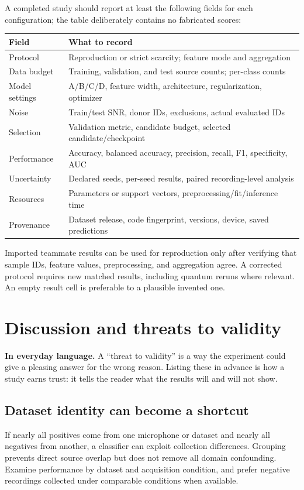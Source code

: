 \documentclass[11pt,letterpaper]{article}
\newcommand{\plain}[1]{\par\smallskip\noindent\textbf{In everyday language.} #1\par\smallskip}
\begin{document}
A completed study should report at least the following fields for each
configuration; the table deliberately contains no fabricated scores:
\begin{center}
\begin{tabularx}{\linewidth}{@{}lY@{}}
\toprule
Field & What to record \\
\midrule
Protocol & Reproduction or strict scarcity; feature mode and aggregation \\
Data budget & Training, validation, and test source counts; per-class counts \\
Model settings & A/B/C/D, feature width, architecture, regularization, optimizer \\
Noise & Train/test SNR, donor IDs, exclusions, actual evaluated IDs \\
Selection & Validation metric, candidate budget, selected candidate/checkpoint \\
Performance & Accuracy, balanced accuracy, precision, recall, F1, specificity, AUC \\
Uncertainty & Declared seeds, per-seed results, paired recording-level analysis \\
Resources & Parameters or support vectors, preprocessing/fit/inference time \\
Provenance & Dataset release, code fingerprint, versions, device, saved predictions \\
\bottomrule
\end{tabularx}
\end{center}
Imported teammate results can be used for reproduction only after verifying
that sample IDs, feature values, preprocessing, and aggregation agree. A
corrected protocol requires new matched results, including quantum reruns
where relevant. An empty result cell is preferable to a plausible invented one.

\section{Discussion and threats to validity}
\plain{A ``threat to validity'' is a way the experiment could give a pleasing
answer for the wrong reason. Listing these in advance is how a study earns
trust: it tells the reader what the results will and will not show.}

\subsection{Dataset identity can become a shortcut}
If nearly all positives come from one microphone or dataset and nearly all
negatives from another, a classifier can exploit collection differences.
Grouping prevents direct source overlap but does not remove all domain
confounding. Examine performance by dataset and acquisition condition, and
prefer negative recordings collected under comparable conditions when available.
\end{document}
